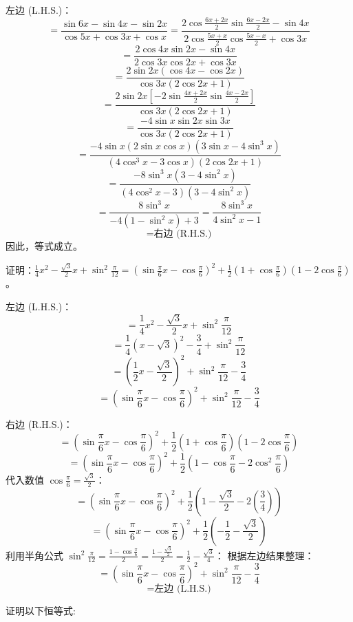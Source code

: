 \begin{questions}
\begin{solution}
左边 (L.H.S.)：
\[ = \frac{\sin 6x - \sin 4x - \sin 2x}{\cos 5x + \cos 3x + \cos x} = \frac{2 \cos \frac{6x+2x}{2} \sin \frac{6x-2x}{2} - \sin 4x}{2 \cos \frac{5x+x}{2} \cos \frac{5x-x}{2} + \cos 3x} \]
\[ = \frac{2 \cos 4x \sin 2x - \sin 4x}{2 \cos 3x \cos 2x + \cos 3x} \]
\[ = \frac{2 \sin 2x (\cos 4x - \cos 2x)}{\cos 3x (2 \cos 2x + 1)} \]
\[ = \frac{2 \sin 2x [-2 \sin \frac{4x+2x}{2} \sin \frac{4x-2x}{2}]}{\cos 3x (2 \cos 2x + 1)} \]
\[ = \frac{-4 \sin x \sin 2x \sin 3x}{\cos 3x (2 \cos 2x + 1)} \]
\[ = \frac{-4 \sin x (2 \sin x \cos x) (3 \sin x - 4 \sin^3 x)}{(4 \cos^3 x - 3 \cos x) (2 \cos 2x + 1)} \]
\[ = \frac{-8 \sin^3 x (3 - 4 \sin^2 x)}{(4 \cos^2 x - 3) (3 - 4 \sin^2 x)} \]
\[ = \frac{8 \sin^3 x}{-4 (1 - \sin^2 x) + 3} = \frac{8 \sin^3 x}{4 \sin^2 x - 1} \]
\[ = \text{右边 (R.H.S.)} \]
因此，等式成立。
\end{solution}

\question
证明：$\frac{1}{4}x^2 - \frac{\sqrt{3}}{2}x + \sin^2 \frac{\pi}{12} = (\sin \frac{\pi}{6}x - \cos \frac{\pi}{6})^2 + \frac{1}{2}(1 + \cos \frac{\pi}{6})(1 - 2\cos \frac{\pi}{6})$。

\begin{solution}
左边 (L.H.S.)：
\[ = \frac{1}{4}x^2 - \frac{\sqrt{3}}{2}x + \sin^2 \frac{\pi}{12} \]
\[ = \frac{1}{4}(x - \sqrt{3})^2 - \frac{3}{4} + \sin^2 \frac{\pi}{12} \]
\[ = (\frac{1}{2}x - \frac{\sqrt{3}}{2})^2 + \sin^2 \frac{\pi}{12} - \frac{3}{4} \]
\[ = (\sin \frac{\pi}{6}x - \cos \frac{\pi}{6})^2 + \sin^2 \frac{\pi}{12} - \frac{3}{4} \]

右边 (R.H.S.)：
\[ = (\sin \frac{\pi}{6}x - \cos \frac{\pi}{6})^2 + \frac{1}{2}(1 + \cos \frac{\pi}{6})(1 - 2\cos \frac{\pi}{6}) \]
\[ = (\sin \frac{\pi}{6}x - \cos \frac{\pi}{6})^2 + \frac{1}{2}(1 - \cos \frac{\pi}{6} - 2\cos^2 \frac{\pi}{6}) \]
代入数值 $\cos \frac{\pi}{6} = \frac{\sqrt{3}}{2}$：
\[ = (\sin \frac{\pi}{6}x - \cos \frac{\pi}{6})^2 + \frac{1}{2}(1 - \frac{\sqrt{3}}{2} - 2(\frac{3}{4})) \]
\[ = (\sin \frac{\pi}{6}x - \cos \frac{\pi}{6})^2 + \frac{1}{2}(- \frac{1}{2} - \frac{\sqrt{3}}{2}) \]
利用半角公式 $\sin^2 \frac{\pi}{12} = \frac{1 - \cos \frac{\pi}{6}}{2} = \frac{1 - \frac{\sqrt{3}}{2}}{2} = \frac{1}{2} - \frac{\sqrt{3}}{4}$：
根据左边结果整理：
\[ = (\sin \frac{\pi}{6}x - \cos \frac{\pi}{6})^2 + \sin^2 \frac{\pi}{12} - \frac{3}{4} \]
\[ = \text{左边 (L.H.S.)} \]
\end{solution}

    \question 证明以下恒等式:
    \begin{parts}

\end{parts}
\end{questions}
